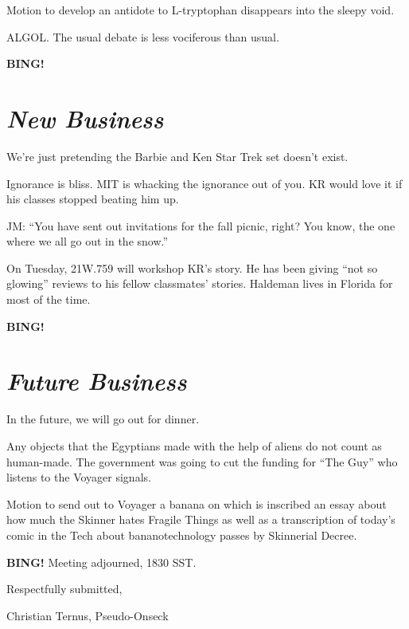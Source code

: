 \documentclass[10pt]{article}
\newcommand{\bing}{{\bf BING!} }
\newcommand{\goto}[1]{\bing \vskip 12pt \section*{{\em{#1}}}}
\begin{document}
Motion to develop an antidote to L-tryptophan disappears into the sleepy void.

ALGOL. The usual debate is less vociferous than usual.

\goto{New Business}

We're just pretending the Barbie and Ken Star Trek set doesn't exist.

Ignorance is bliss. MIT is whacking the ignorance out of you. KR would love it if his classes stopped beating him up. 

JM: ``You have sent out invitations for the fall picnic, right? You know, the one where we all go out in the snow.''

On Tuesday, 21W.759 will workshop KR's story. He has been giving ``not so glowing'' reviews to his fellow classmates' stories. Haldeman lives in Florida for most of the time.

\goto{Future Business}

In the future, we will go out for dinner. 

Any objects that the Egyptians made with the help of aliens do not count as human-made. The government was going to cut the funding for ``The Guy'' who listens to the Voyager signals.

Motion to send out to Voyager a banana on which is inscribed an essay about how much the Skinner hates Fragile Things as well as a transcription of today's comic in the Tech about bananotechnology passes by Skinnerial Decree.

\bing
\noindent
Meeting adjourned, 1830 SST.

\vspace{18pt}

\centerline{Respectfully submitted,}
\centerline{Christian Ternus, Pseudo-Onseck}
\end{document}

